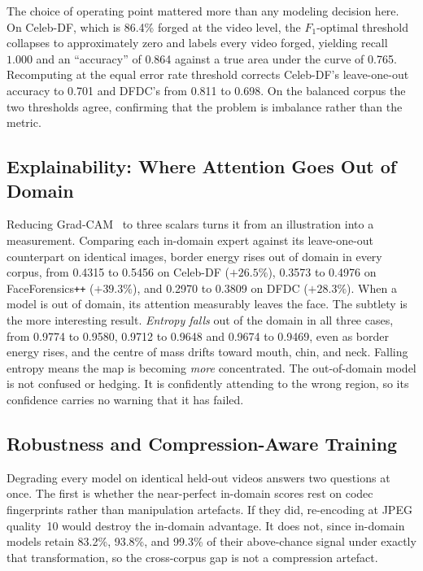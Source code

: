 \documentclass[journal,onecolumn]{IEEEtran}
\newcommand{\celebdf}{Celeb-DF}
\newcommand{\dfdc}{DFDC}
\begin{document}
The choice of operating point mattered more than any modeling decision here. On
\celebdf{}, which is 86.4\% forged at the video level, the $F_1$-optimal
threshold collapses to approximately zero and labels every video forged, yielding
recall $1.000$ and an ``accuracy'' of 0.864 against a true area under the curve
of 0.765. Recomputing at the equal error rate threshold corrects \celebdf{}'s
leave-one-out accuracy to 0.701 and \dfdc{}'s from 0.811 to 0.698. On the
balanced corpus the two thresholds agree, confirming that the problem is
imbalance rather than the metric.

\subsection{Explainability: Where Attention Goes Out of Domain}

Reducing Grad-CAM~\cite{selvaraju2017gradcam} to three scalars turns it from an
illustration into a measurement. Comparing each in-domain expert against its
leave-one-out counterpart on identical images, border energy rises out of domain
in every corpus, from 0.4315 to 0.5456 on \celebdf{} ($+26.5\%$), 0.3573 to
0.4976 on FaceForensics\texttt{++} ($+39.3\%$), and 0.2970 to 0.3809 on \dfdc{}
($+28.3\%$). When a model is out of domain, its attention measurably leaves the
face. The subtlety is the more interesting result. \emph{Entropy falls} out of
the domain in all three cases, from 0.9774 to 0.9580, 0.9712 to 0.9648 and 0.9674 to
0.9469, even as border energy rises, and the centre of mass drifts toward mouth,
chin, and neck. Falling entropy means the map is becoming \emph{more}
concentrated. The out-of-domain model is not confused or hedging. It is
confidently attending to the wrong region, so its confidence carries no warning
that it has failed.

\subsection{Robustness and Compression-Aware Training}
\label{ssec:compaware}

Degrading every model on identical held-out videos answers two questions at once.
The first is whether the near-perfect in-domain scores rest on codec fingerprints
rather than manipulation artefacts. If they did, re-encoding at JPEG quality~10
would destroy the in-domain advantage. It does not, since in-domain models retain
83.2\%, 93.8\%, and 99.3\% of their above-chance signal under exactly that
transformation, so the cross-corpus gap is not a compression artefact.
\end{document}

